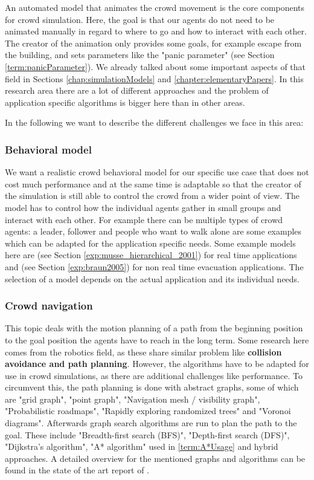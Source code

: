 \documentclass{acmsiggraph}               %
\begin{document}
An automated model that animates the crowd movement is the core components for crowd simulation. Here, the goal is that our agents do not need to be animated manually in regard to where to go and how to interact with each other. The creator of the animation only provides some goals, for example escape from the building, and sets parameters like the "panic parameter" (see Section \ref{term:panicParameter}). We already talked about some important aspects of that field in Sections \ref{chap:simulationModels} and \ref{chapter:elementaryPapers}.  In this research area there are a lot of different approaches and the problem of application specific algorithms is bigger here than in other areas.

In the following we want to describe the different challenges we face in this area:

\subsubsection{Behavioral model}
We want a realistic crowd behavioral model for our specific use case that does not cost much performance and at the same time is adaptable so that the creator of the simulation is still able to control the crowd from a wider point of view. The model has to control how the individual agents gather in small groups and interact with each other. For example there can be multiple types of crowd agents: a leader, follower and people who want to walk alone are some examples which can be adapted for the application specific needs. Some example models here are \cite{musse_hierarchical_2001} (see Section \ref{exp:musse_hierarchical_2001}) for real time applications and \cite{braun_simulating_2005} (see Section \ref{exp:braun2005}) for non real time evacuation applications. The selection of a model depends on the actual application and its individual needs.

\subsubsection{Crowd navigation}
This topic deals with the motion planning of a path from the beginning position to the goal position the agents have to reach in the long term. Some research here comes from the robotics field, as these share similar problem like \textbf{collision avoidance and path planning}. However, the algorithms have to be adapted for use in crowd simulations, as there are additional challenges like performance. To circumvent this, the path planning is done with abstract graphs, some of which are "grid graph", "point graph", "Navigation mesh / visibility graph", "Probabilistic roadmaps", "Rapidly exploring randomized trees" and "Voronoi diagrams". Afterwards graph search algorithms are run to plan the path to the goal. These include "Breadth-ﬁrst search (BFS)",  "Depth-ﬁrst search (DFS)", "Dijkstra’s algorithm", "A* algorithm" used in \ref{term:A*Usage} and hybrid approaches. A detailed overview for the mentioned graphs and algorithms can be found in the state of the art report of \cite{jaros_crowd_2014}. 
\end{document}
